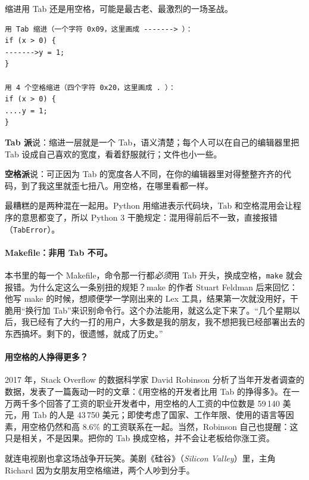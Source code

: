 缩进用 Tab 还是用空格，可能是最古老、最激烈的一场圣战。

\begin{verbatim}
用 Tab 缩进（一个字符 0x09，这里画成 -------> ）：
if (x > 0) {
------->y = 1;
}

用 4 个空格缩进（四个字符 0x20，这里画成 . ）：
if (x > 0) {
....y = 1;
}
\end{verbatim}

\textbf{Tab 派}说：缩进一层就是一个 Tab，语义清楚；每个人可以在自己的编辑器里把 Tab 设成自己喜欢的宽度，看着舒服就行；文件也小一些。

\textbf{空格派}说：可正因为 Tab 的宽度各人不同，在你的编辑器里对得整整齐齐的代码，到了我这里就歪七扭八。用空格，在哪里看都一样。

最糟糕的是两种混在一起用。Python 用缩进表示代码块，Tab 和空格混用会让程序的意思都变了，所以 Python 3 干脆规定：混用得前后不一致，直接报错（\texttt{TabError}）。

\paragraph{Makefile：非用 Tab 不可。}
本书里的每一个 Makefile，命令那一行都\emph{必须}用 Tab 开头，换成空格，\texttt{make} 就会报错。为什么定这么一条别扭的规矩？make 的作者 Stuart Feldman 后来回忆：他写 make 的时候，想顺便学一学刚出来的 Lex 工具，结果第一次就没用好，干脆用“换行加 Tab”来识别命令行。这个办法能用，就这么定下来了。“几个星期以后，我已经有了大约一打的用户，大多数是我的朋友，我不想把我已经部署出去的东西搞坏。剩下的，很遗憾，就成了历史。”

\paragraph{用空格的人挣得更多？}
2017 年，Stack Overflow 的数据科学家 David Robinson 分析了当年开发者调查的数据，发表了一篇轰动一时的文章：《用空格的开发者比用 Tab 的挣得多》。在一万两千多个回答了工资的职业开发者中，用空格的人工资的中位数是 59\,140 美元，用 Tab 的人是 43\,750 美元；即使考虑了国家、工作年限、使用的语言等因素，用空格仍然和高 8.6\% 的工资联系在一起。当然，Robinson 自己也提醒：这只是相关，不是因果。把你的 Tab 换成空格，并不会让老板给你涨工资。

就连电视剧也拿这场战争开玩笑。美剧《硅谷》（\emph{Silicon Valley}）里，主角 Richard 因为女朋友用空格缩进，两个人吵到分手。

